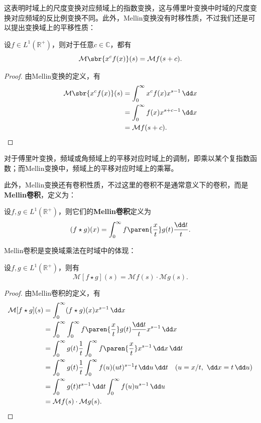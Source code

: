 这表明时域上的尺度变换对应频域上的指数变换，这与傅里叶变换中时域的尺度变换对应频域的反比例变换不同。此外，Mellin变换没有时移性质，不过我们还是可以提出变换域上的平移性质：

\begin{proposition}[Mellin变换的乘幂性质]
    设$f\in L^1(\mathbb{R}^+)$，则对于任意$c\in\mathbb{C}$，都有
    \begin{equation}
        \mathcal{M}\sbr{x^c f(x)}(s)=\mathcal{M}f(s+c).
    \end{equation}
\end{proposition}
\begin{proof}
    由Mellin变换的定义，有
    \begin{align}
        \mathcal{M}\sbr{x^c f(x)}(s)&=\int_0^{\infty}x^c f(x)x^{s-1}\,\dd x\nonumber\\
        &=\int_0^{\infty}f(x)x^{s+c-1}\,\dd x\nonumber\\
        &=\mathcal{M}f(s+c).
    \end{align}
\end{proof}

对于傅里叶变换，频域或角频域上的平移对应时域上的调制，即乘以某个复指数函数；而Mellin变换中，频域上的平移对应时域上的乘幂。

此外，Mellin变换还有卷积性质，不过这里的卷积不是通常意义下的卷积，而是\textbf{Mellin卷积}，定义为：
\begin{definition}[Mellin卷积]
    设$f,g\in L^1(\mathbb{R}^+)$，则它们的\textbf{Mellin卷积}定义为
    \begin{equation}
        (f\star g)(x)=\int_0^{\infty}f\paren{\frac{x}{t}}g(t)\frac{\dd t}{t}.
    \end{equation}
\end{definition}

Mellin卷积是变换域乘法在时域中的体现：

\begin{proposition}[Mellin卷积的变换性质]
    设$f,g\in L^1(\mathbb{R}^+)$，则有
    \begin{equation}
        \mathcal{M}[f\star g](s)=\mathcal{M}f(s)\cdot\mathcal{M}g(s).
    \end{equation}
\end{proposition}
\begin{proof}
    由Mellin卷积的定义，有
    \begin{align}
        \mathcal{M}[f\star g](s)&=\int_0^{\infty}(f\star g)(x)x^{s-1}\,\dd x\nonumber\\
        &=\int_0^{\infty}\int_0^{\infty}f\paren{\frac{x}{t}}g(t)\frac{\dd t}{t}x^{s-1}\,\dd x\nonumber\\
        &=\int_0^{\infty}g(t)\frac{1}{t}\int_0^{\infty}f\paren{\frac{x}{t}}x^{s-1}\,\dd x\,\dd t\nonumber\\
        &=\int_0^{\infty}g(t)\frac{1}{t}\int_0^{\infty}f(u)(ut)^{s-1}t\,\dd u\,\dd t\quad (u=x/t,\ \dd x=t\,\dd u)\nonumber\\
        &=\int_0^{\infty}g(t)t^{s-1}\,\dd t\int_0^{\infty}f(u)u^{s-1}\,\dd u\nonumber\\
        &=\mathcal{M}f(s)\cdot\mathcal{M}g(s).
    \end{align}
\end{proof}

